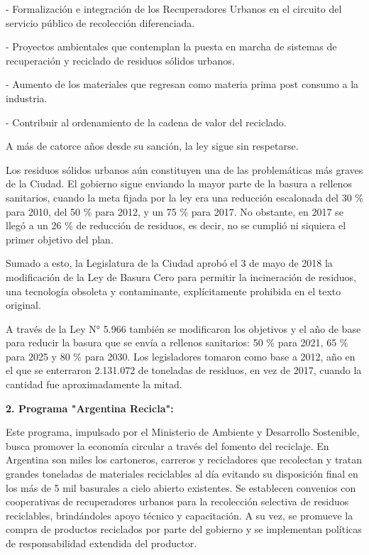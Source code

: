 \documentclass[runningheads]{llncs}
\begin{document}
- Formalización e integración de los Recuperadores Urbanos en el circuito del servicio público de recolección diferenciada.

- Proyectos ambientales que contemplan la puesta en marcha de sistemas de recuperación y reciclado de residuos sólidos urbanos.

- Aumento de los materiales que regresan como materia prima post consumo a la industria.

- Contribuir al ordenamiento de la cadena de valor del reciclado.

A más de catorce años desde su sanción, la ley sigue sin respetarse.

Los residuos sólidos urbanos aún constituyen una de las problemáticas más graves de la Ciudad. El gobierno sigue enviando la mayor parte de la basura a rellenos sanitarios, cuando la meta fijada por la ley era una reducción escalonada del 30 \% para 2010, del 50 \% para 2012, y un 75 \% para 2017. No obstante, en 2017 se llegó a un 26 \% de reducción de residuos, es decir, no se cumplió ni siquiera el primer objetivo del plan.

Sumado a esto, la Legislatura de la Ciudad aprobó el 3 de mayo de 2018 la modificación de la Ley de Basura Cero para permitir la incineración de residuos, una tecnología obsoleta y contaminante, explícitamente prohibida en el texto original.

A través de la Ley N° 5.966 también se modificaron los objetivos y el año de base para reducir la basura que se envía a rellenos sanitarios: 50 \% para 2021, 65 \% para 2025 y 80 \% para 2030. Los legisladores tomaron
como base a 2012, año en el que se enterraron 2.131.072  de toneladas
de residuos, en vez de 2017, cuando la cantidad fue aproximadamente la mitad.

\textbf{2. Programa "Argentina Recicla":}

Este programa, impulsado por el Ministerio de Ambiente y Desarrollo Sostenible, busca promover la economía circular a través del fomento del reciclaje. En Argentina son miles los cartoneros, carreros y recicladores que recolectan y tratan grandes toneladas de materiales reciclables al día evitando su disposición final en los más de 5 mil basurales a cielo abierto existentes. Se establecen convenios con cooperativas de recuperadores urbanos para la recolección selectiva de residuos reciclables, brindándoles apoyo técnico y capacitación. A su vez, se promueve la compra de productos reciclados por parte del gobierno y se implementan políticas de responsabilidad extendida del productor.
\end{document}
